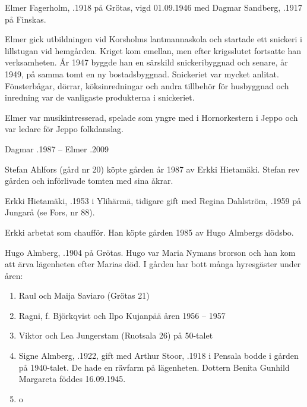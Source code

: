Elmer Fagerholm, .1918 på Grötas, vigd 01.09.1946 med Dagmar Sandberg, .1917 på Finskas.
\begin{jhchildren}
  \item {}
  \item {}
\end{jhchildren}
Elmer gick utbildningen vid Korsholms lantmannaskola och startade ett snickeri i lillstugan vid hemgården. Kriget kom emellan, men efter krigsslutet fortsatte han verksamheten. År 1947 byggde han en särskild snickeribyggnad och senare, år 1949, på samma tomt en ny bostadsbyggnad. Snickeriet var mycket anlitat. Fönsterbågar, dörrar, köksinredningar och andra tillbehör för husbyggnad och inredning var de vanligaste produkterna i snickeriet.

Elmer var musikintresserad, spelade som yngre med i Hornorkestern i Jeppo och var ledare för Jeppo folkdanslag.

Dagmar .1987  --  Elmer .2009




Stefan Ahlfors (gård nr 20) köpte gården år 1987 av Erkki Hietamäki. Stefan rev gården och införlivade tomten med sina åkrar.


Erkki Hietamäki, .1953 i Ylihärmä, tidigare gift med Regina Dahlström, .1959  på Jungarå (se Fors, nr 88).
\begin{jhchildren}
  \item {}
  \item {}
\end{jhchildren}
Erkki arbetat som chaufför. Han köpte gården 1985 av Hugo Almbergs dödsbo.


Hugo Almberg, .1904 på Grötas. Hugo var Maria Nymans brorson och han kom att ärva lägenheten efter Marias död. I gården har bott många hyresgäster under åren:
\begin{enumerate}
  \item Raul och Maija Saviaro (Grötas  21)
  \item Ragni, f. Björkqvist och Ilpo Kujanpää åren 1956 – 1957
  \item Viktor och Lea Jungerstam (Ruotsala 26) på 50-talet
  \item Signe Almberg, .1922, gift med Arthur Stoor, .1918  i Pensala bodde i gården på 1940-talet. De hade en rävfarm på lägenheten. Dottern Benita Gunhild Margareta föddes 16.09.1945.
  \item o
\end{enumerate}


